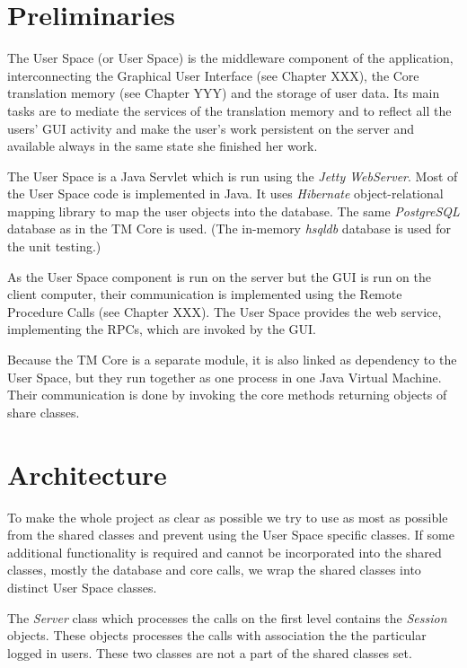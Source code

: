 \section{Preliminaries}

The User Space (or User Space) is the middleware component of the application, interconnecting the Graphical User Interface (see Chapter XXX), the Core translation memory (see Chapter YYY) and the storage of user data.
Its main tasks are to mediate the services of the translation memory and to reflect all the users' GUI activity and make the user's work persistent on the server and available always in the same state she finished her work.

The User Space is a Java Servlet which is run using the \emph{Jetty WebServer}. Most of the User Space code is implemented in Java. It uses \emph{Hibernate} object-relational mapping library to map the user objects into the database. The same \emph{PostgreSQL} database as in the TM Core is used. (The in-memory \emph{hsqldb} database is used for the unit testing.)

As the User Space component is run on the server but the GUI is run on the client computer, their communication is implemented using the Remote Procedure Calls (see Chapter XXX).
The User Space provides the web service, implementing the RPCs, which are invoked by the GUI.

Because the TM Core is a separate module, it is also linked as dependency to the User Space, but they run together as one process in one Java Virtual Machine. Their communication is done by invoking the core methods returning objects of share classes.

\section{Architecture}

To make the whole project as clear as possible we try to use as most as possible from the shared classes and prevent using the User Space specific classes. If some additional functionality is required and cannot be incorporated into the shared classes, mostly the database and core calls, we wrap the shared classes into distinct User Space classes.

The \emph{Server} class which processes the calls on the first level contains the {\it Session} objects. These objects processes the calls with association the the particular logged in users. These two classes are not a part of the shared classes set.

